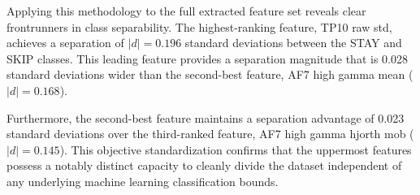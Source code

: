 Applying this methodology to the full extracted feature set reveals clear frontrunners in class separability. The highest-ranking feature, TP10 raw std, achieves a separation of $|d| = 0.196$ standard deviations between the STAY and SKIP classes. This leading feature provides a separation magnitude that is 0.028 standard deviations wider than the second-best feature, AF7 high gamma mean ($|d| = 0.168$). 

Furthermore, the second-best feature maintains a separation advantage of 0.023 standard deviations over the third-ranked feature, AF7 high gamma hjorth mob ($|d| = 0.145$). This objective standardization confirms that the uppermost features possess a notably distinct capacity to cleanly divide the dataset independent of any underlying machine learning classification bounds.